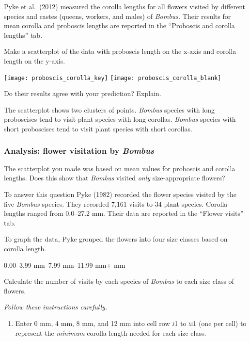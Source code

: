 \documentclass[12pt, hidelinks, twoside]{exam}
\newcommand*\AnswerBox[2]{%
    \parbox[t][#1]{0.92\textwidth}{%
    \begin{solution}#2\end{solution}}
    \vspace{\stretch{1}}
}
\begin{document}
\begin{questions}
Pyke et al.~(2012) measured the corolla lengths for all flowers visited by different species and castes (queens, workers, and males) of \textit{Bombus.} Their results for mean corolla and proboscis lengths are reported in the “Proboscis and corolla lengths” tab. 

\question
Make a scatterplot of the data with proboscis length on the x-axis and corolla length on the y-axis.

\ifprintanswers
	\texttt{[image: proboscis\_corolla\_key]}
\else
	\texttt{[image: proboscis\_corolla\_blank]}
\fi


\question
Do their results agree with your prediction? Explain.

\AnswerBox{0.2\textheight}{The scatterplot shows two clusters of points. 
\textit{Bombus} species with long proboscises tend to visit plant species with 
long corollas. \textit{Bombus} species with short proboscises tend to visit plant species with short corollas.}


\subsubsection*{Analysis: flower visitation by \textit{Bombus}}

The scatterplot you made was based on mean values for proboscis and corolla 
lengths. Does this show that \textit{Bombus} visited \emph{only} size-appropriate flowers?  

To answer this question Pyke (1982) recorded the flower species visited by the five \textit{Bombus} species. They recorded 7,161 visits to 34 plant species. Corolla lengths ranged from 0.0–27.2 mm. Their data are reported in the “Flower visits” tab.

To graph the data, Pyke grouped the flowers into four size classes based on corolla length. %

0.00–3.99 mm–7.99 mm–11.99 mm$+$ mm

\question
Calculate the number of visits by each species of \textit{Bombus} to each size class of flowers. %

\emph{Follow these instructions carefully.}

\begin{enumerate}
	\item Enter 0 mm, 4 mm, 8 mm, and 12 mm into cell row \textsc{j}1 to \textsc{m}1 (one per cell)
	to represent the \emph{minimum} corolla length needed for each size class.
	

\end{enumerate}
\end{questions}
\end{document}
